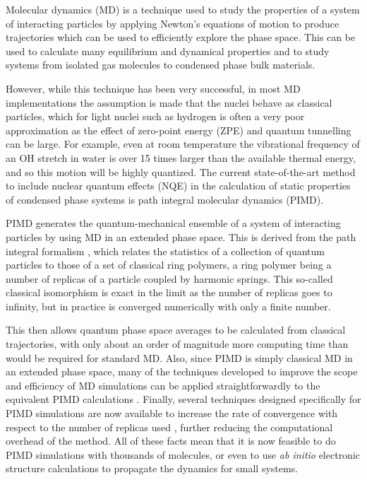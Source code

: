 \documentclass[11pt,english,fleqn]{report}
\begin{document}
Molecular dynamics (MD) is a technique used to study the properties
of a system of interacting particles by applying Newton's equations
of motion to produce trajectories which can be used to efficiently
explore the phase space. This can be used to calculate many equilibrium
and dynamical properties and to study systems from isolated gas molecules
to condensed phase bulk materials.

However, while this technique has been very successful, in most MD
implementations the assumption is made that the nuclei behave as classical
particles, which for light nuclei such as hydrogen is often a very
poor approximation as the effect of zero-point energy (ZPE) and quantum
tunnelling can be large. For example, even at room temperature the
vibrational frequency of an OH stretch in water is over 15 times larger
than the available thermal energy, and so this motion will be highly
quantized. The current state-of-the-art method to include nuclear
quantum effects (NQE) in the calculation of static properties of condensed
phase systems is path integral molecular dynamics (PIMD).

PIMD generates the quantum-mechanical ensemble of a system of interacting
particles by using MD in an extended phase space. This is derived
from the path integral formalism \cite{feyn-hibb65book}, which
relates the statistics of a collection of quantum particles to those
of a set of classical ring polymers, a ring polymer being a number
of replicas of a particle coupled by harmonic springs. This so-called
classical isomorphism is exact in the limit as the number of replicas
goes to infinity, but in practice is converged numerically with only
a finite number.

This then allows quantum phase space averages to be calculated from
classical trajectories, with only about an order of magnitude more
computing time than would be required for standard MD. Also, since
PIMD is simply classical MD in an extended phase space, many of the
techniques developed to improve the scope and efficiency of MD simulations
can be applied straightforwardly to the equivalent PIMD calculations
\cite{ceri+10jcp,mart+99jcp}. Finally, several techniques designed
specifically for PIMD simulations are now available to increase the
rate of convergence with respect to the number of replicas used 
\cite{mark-mano08jcp,ceri+11jcp,suzu95pla,chin97pla,ceri+12prsa,pere-tuck11jcp},
further reducing the computational overhead of the method. All
of these facts mean that it is now feasible to do PIMD simulations
with thousands of molecules, or even to use \emph{ab initio} electronic
structure calculations to propagate the dynamics for small systems.
\end{document}
